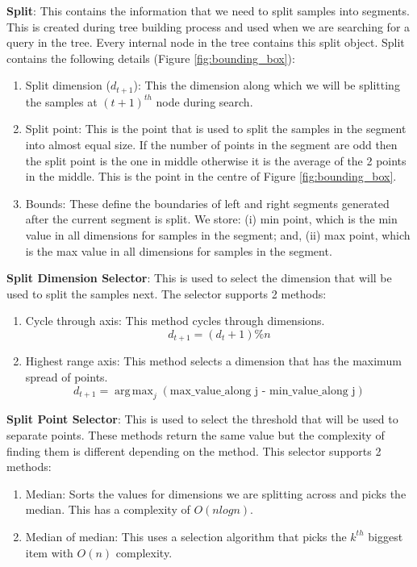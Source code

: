 \documentclass[11pt]{amsart}
\begin{document}
\begin{list}{}{\leftmargin= 1.4cm}
\item \textbf{Split}: This contains the information that we need to split samples into segments. This is created during tree building process and used when we are searching for a query in the tree. Every internal node in the tree contains this split object. Split contains the following details (Figure \ref{fig:bounding_box}):
\vspace{1.5 mm}
\begin{enumerate} \setlength\itemsep{0.5em}
\item Split dimension ($d_{t+1}$): This the dimension along which we will be splitting the samples at ${(t+1)}^{th}$ node during search.
\item Split point: This is the point that is used to split the samples in the segment into almost equal size. If the number of points in the segment are odd then the split point is the one in middle otherwise it is the average of the 2 points in the middle. This is the point in the centre of Figure  \ref{fig:bounding_box}.
\item Bounds:  These define the boundaries of left and right segments generated after the current segment is split. We store: (i) min point, which is the min value in all dimensions for samples in the segment; and, (ii) max point, which is the max value in all dimensions for samples in the segment.
\end{enumerate}
\item \textbf{Split Dimension Selector}: This is used to select the dimension that will be used to split the samples next. The selector supports 2 methods:
\vspace{1.5 mm}
\begin{enumerate}\setlength\itemsep{0.5em}
\item Cycle through axis: This method cycles through dimensions. 
\[ d_{t+1} = (d_{t} + 1)  \% n \]
\item Highest range axis: This method selects a dimension that has the maximum spread of points.
\[ d_{t+1} = \operatorname{arg\,max}_j  (\text{max\_value\_along j - min\_value\_along j})\] 
\end{enumerate}

\item \textbf{Split Point Selector}: This is used to select the threshold that will be used to separate points. These methods return the same value but the complexity of finding them is different depending on the method. This selector supports 2 methods:
\vspace{1.5 mm}
\begin{enumerate}\setlength\itemsep{0.5em}
\item Median: Sorts the values for dimensions we are splitting across and picks the median. This has a complexity of $O(nlogn)$. 
\item Median \-of \-median: This uses a selection algorithm that picks the $k^{th}$ biggest item with $O(n)$ complexity.
\end{enumerate}


\end{list}
\end{document}
